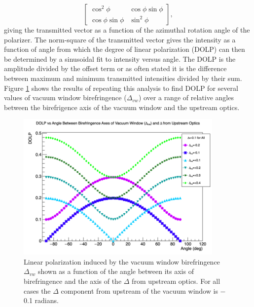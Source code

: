 \documentclass[12pt]{article}
\begin{document}
\begin{equation*}
\begin{bmatrix}
\cos^2\phi     & \cos\phi\sin\phi\\
\cos\phi\sin\phi & \sin^2\phi
\end{bmatrix},
\end{equation*}
giving the transmitted vector as a function of the azimuthal rotation angle of the polarizer. The norm-square of the transmitted vector gives the intensity as a function of angle from which the degree of linear polarization (DOLP) can then be determined by a sinusoidal fit to intensity versus angle. The DOLP is the amplitude divided by the offset term or as often stated it is the difference between maximum and minimum transmitted intensities divided by their sum. 
Figure \ref{fig:pita_vs_angle} shows the results of repeating this analysis to find DOLP for several values of vacuum window birefringence ($\Delta_{vw}$) over a range of relative angles between the birefrigence axis of the vacuum window and the upstream optics.
\begin{figure}
	\includegraphics[width=0.9\textwidth]{Vacuum_window_delta_vs_angle.png}
	\caption{\label{fig:pita_vs_angle}Linear polarization induced by the vacuum window birefringence $\Delta_{vw}$ shown as a function of the angle between its axis of birefringence and the axis of the $\Delta$ from upstream optics. For all cases the $\Delta$ component from upstream of the vacuum window is $-$0.1 radians.}
\end{figure}
\end{document}
